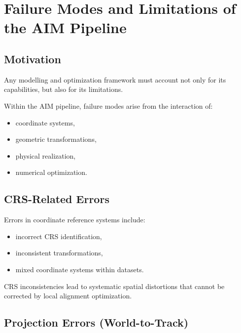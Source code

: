 
\section{Failure Modes and Limitations of the AIM Pipeline}

\subsection*{Motivation}

Any modelling and optimization framework must account not only for its
capabilities, but also for its limitations.

Within the AIM pipeline, failure modes arise from the interaction of:
\begin{itemize}
\item coordinate systems,
\item geometric transformations,
\item physical realization,
\item numerical optimization.
\end{itemize}


\subsection{CRS-Related Errors}

Errors in coordinate reference systems include:
\begin{itemize}
\item incorrect CRS identification,
\item inconsistent transformations,
\item mixed coordinate systems within datasets.
\end{itemize}

\begin{proposition}
CRS inconsistencies lead to systematic spatial distortions that cannot
be corrected by local alignment optimization.
\end{proposition}


\subsection{Projection Errors (World-to-Track)}


